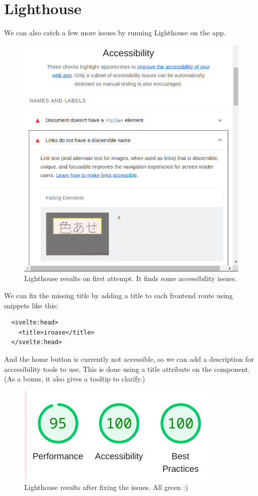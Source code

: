 \documentclass{report}
\begin{document}
\section{Lighthouse}
We can also catch a few more issues by running Lighthouse on the app.
\begin{figure}[H]
  \centering
  \includegraphics{./media/evaluation/lighthouse_problem.png}
  \caption{Lighthouse results on first attempt. It finds some accessibility issues.}
  \label{fig:lighthouse}
\end{figure}

We can fix the missing title by adding a title to each frontend route using snippets like this:
\begin{verbatim}
  <svelte:head>
    <title>iroase</title>
  </svelte:head>
\end{verbatim}

And the home button is currently not accessible, so we can add a description for accessibility tools to use. This is done using a title attribute on the component. (As a bonus, it also gives a tooltip to clarify.)

\begin{figure}[H]
  \centering
  \includegraphics{./media/evaluation/lighthouse.png}
  \caption{Lighthouse results after fixing the issues. All green :)}
  \label{fig:lighthouse2}
\end{figure}
\end{document}
